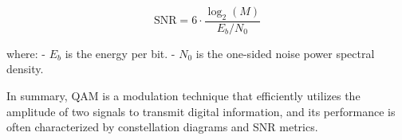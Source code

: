\documentclass[../../../../DMCC-My-Notebook]{subfiles}
\begin{document}
	\[ \text{SNR} = 6 \cdot \frac{\log_2(M)}{E_b/N_0} \]
	
	where:
	- \( E_b \) is the energy per bit.
	- \( N_0 \) is the one-sided noise power spectral density.
	
	In summary, QAM is a modulation technique that efficiently utilizes the amplitude of two signals to transmit digital information, and its performance is often characterized by constellation diagrams and SNR metrics.
	
	
	\pagebreak
	
	
	
%		
%		
%		
%		
%		
%		
%		
%		
%		
%		
%		
%		
%		
%		
%		
%		
%		
%		
%		
%		
%		
%		
%		
%		
\end{document}
